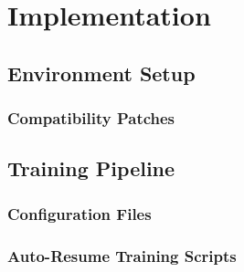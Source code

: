 \chapter{Implementation}
\label{ch:implementation}

\section{Environment Setup}
\label{sec:impl_env}


\subsection{Compatibility Patches}

\section{Training Pipeline}
\label{sec:impl_training}

\subsection{Configuration Files}

\subsection{Auto-Resume Training Scripts}

